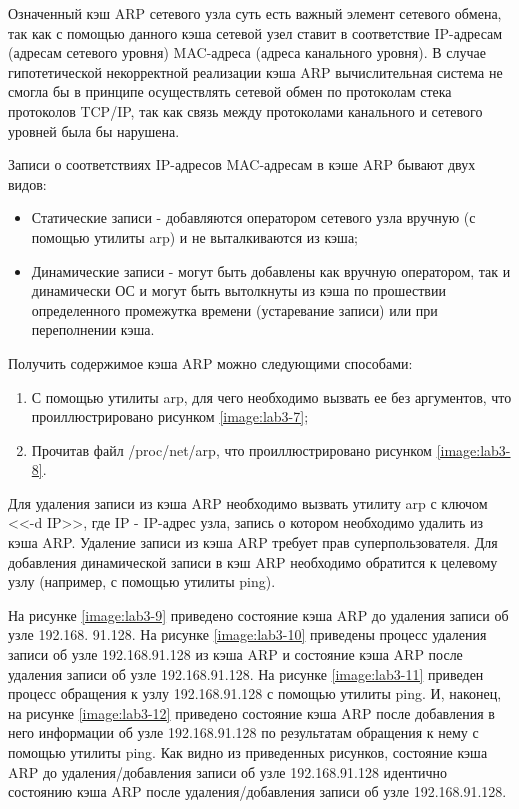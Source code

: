 	Означенный кэш ARP сетевого узла суть есть важный элемент сетевого обмена, так как с помощью данного кэша сетевой узел ставит в соответствие
	IP-адресам (адресам сетевого уровня) MAC-адреса (адреса канального уровня). В случае гипотетической некорректной реализации кэша ARP вычислительная система
	не смогла бы в принципе осуществлять сетевой обмен по протоколам стека протоколов TCP/IP, так как связь между протоколами канального и сетевого уровней
	была бы нарушена.

	Записи о соответствиях IP-адресов MAC-адресам в кэше ARP бывают двух видов:

	\begin{itemize}

		\item Статические записи - добавляются оператором сетевого узла вручную (с помощью утилиты arp) и не выталкиваются из кэша;
		\item Динамические записи - могут быть добавлены как вручную оператором, так и динамически ОС и могут быть вытолкнуты из кэша
		по прошествии определенного промежутка времени (устаревание записи) или при переполнении кэша.

	\end{itemize}

	Получить содержимое кэша ARP можно следующими способами:

	\begin{enumerate}

		\item С помощью утилиты arp, для чего необходимо вызвать ее без аргументов, что проиллюстрировано рисунком \ref{image:lab3-7};
		\item Прочитав файл /proc/net/arp, что проиллюстрировано рисунком \ref{image:lab3-8}.

	\end{enumerate}


	Для удаления записи из кэша ARP необходимо вызвать утилиту arp с ключом <<-d IP>>, где IP - IP-адрес узла, запись о котором необходимо
	удалить из кэша ARP. Удаление записи из кэша ARP требует прав суперпользователя.
	Для добавления динамической записи в кэш ARP необходимо обратится к целевому узлу (например, с помощью утилиты ping).

	На рисунке \ref{image:lab3-9} приведено состояние кэша ARP до удаления записи об узле 192.168. 91.128.
	На рисунке \ref{image:lab3-10} приведены процесс удаления записи об узле 192.168.91.128 из кэша ARP и состояние кэша ARP после удаления записи
	об узле 192.168.91.128. На рисунке \ref{image:lab3-11} приведен процесс обращения к узлу 192.168.91.128 с помощью утилиты ping.
	И, наконец, на рисунке \ref{image:lab3-12} приведено состояние кэша ARP после добавления в него информации об узле 192.168.91.128 по результатам обращения
	к нему с помощью утилиты ping. Как видно из приведенных рисунков, состояние кэша ARP до удаления/добавления записи об узле 192.168.91.128
	идентично состоянию кэша ARP после удаления/добавления записи об узле 192.168.91.128.

